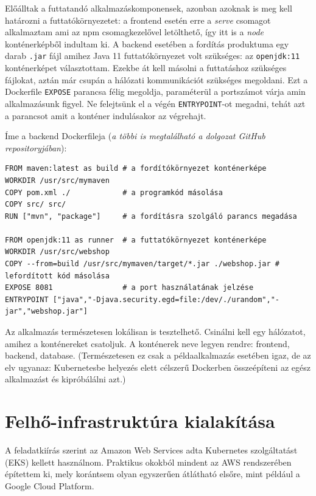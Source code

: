 Előálltak a futtatandó alkalmazáskomponensek, azonban azoknak is meg kell határozni a futtatókörnyezetet: a frontend esetén erre a \textit{serve} csomagot alkalmaztam ami az npm csomagkezelővel letölthető, így itt is a \textit{node} konténerképből indultam ki. A backend esetében a fordítás produktuma egy darab \lstinline{.jar} fájl amihez Java 11 futtatókörnyezet volt szükséges: az \lstinline{openjdk:11} konténerképet választottam. Ezekbe át kell másolni a futtatáshoz szükséges fájlokat, aztán már csupán a hálózati kommunikációt szükséges megoldani. Ezt a Dockerfile \lstinline{EXPOSE} parancsa félig megoldja, paraméterül a portszámot várja amin alkalmazásunk figyel. Ne felejtsünk el a végén \lstinline{ENTRYPOINT}-ot megadni, tehát azt a parancsot amit a konténer indulásakor az végrehajt.

Íme a backend Dockerfileja (\textit{a többi is megtalálható a dolgozat GitHub repositoryjában}):
\begin{lstlisting}
FROM maven:latest as build # a fordítókörnyezet konténerképe
WORKDIR /usr/src/mymaven
COPY pom.xml ./            # a programkód másolása
COPY src/ src/
RUN ["mvn", "package"]     # a fordításra szolgáló parancs megadása

FROM openjdk:11 as runner  # a futtatókörnyezet konténerképe
WORKDIR /usr/src/webshop   
COPY --from=build /usr/src/mymaven/target/*.jar ./webshop.jar # lefordított kód másolása
EXPOSE 8081                # a port használatának jelzése
ENTRYPOINT ["java","-Djava.security.egd=file:/dev/./urandom","-jar","webshop.jar"]
\end{lstlisting}

Az alkalmazás természetesen lokálisan is tesztelhető. Csinálni kell egy hálózatot, amihez a konténereket csatoljuk. A konténerek neve legyen rendre: frontend, backend, database. (Természetesen ez csak a példaalkalmazás esetében igaz, de az elv ugyanaz: Kubernetesbe helyezés elett célszerű Dockerben összeépíteni az egész alkalmazást és kipróbálálni azt.)
\section{Felhő-infrastruktúra kialakítása}
A feladatkiírás szerint az Amazon Web Services adta Kubernetes szolgáltatást (EKS) kellett használnom. Praktikus okokból mindent az AWS rendszerében építettem ki, mely korántsem olyan egyszerűen átlátható elsőre, mint például a Google Cloud Platform.

